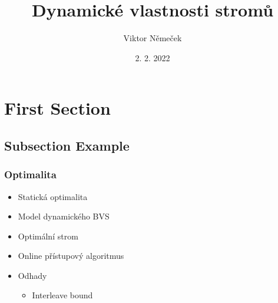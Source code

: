 \documentclass{beamer}
\title[Dynamické vlastnosti stromů]{Dynamické vlastnosti stromů} %
\author{Viktor Němeček} %
\institute[MFF UK] %
{
 \\ %
\medskip
\textit{} %
}
\date{2. 2. 2022} %
\begin{document}
\begin{frame}
\titlepage %
\end{frame}



\section{First Section} %

\subsection{Subsection Example} %



\begin{frame}
\frametitle{Optimalita}
\begin{itemize}
\item Statická optimalita
\item Model dynamického BVS
\item Optimální strom
\item Online přístupový algoritmus
\item Odhady
\begin{itemize}
\item Interleave bound
\end{itemize}
\end{itemize}
\end{frame}
\end{document}
